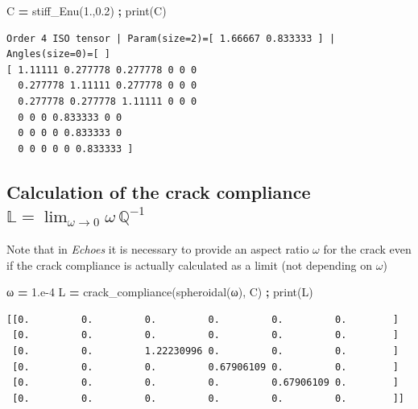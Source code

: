 \documentclass[
  letterpaper,
  DIV=11,
  numbers=noendperiod]{scrreprt}
\newenvironment{Shaded}{\begin{snugshade}}{\end{snugshade}}
\newcommand{\BuiltInTok}[1]{#1}
\newcommand{\FloatTok}[1]{\textcolor[rgb]{0.00,0.00,0.81}{#1}}
\newcommand{\NormalTok}[1]{#1}
\newcommand{\OperatorTok}[1]{\textcolor[rgb]{0.81,0.36,0.00}{\textbf{#1}}}
\begin{document}
\begin{Shaded}
\begin{Highlighting}[]
\NormalTok{C }\OperatorTok{=}\NormalTok{ stiff\_Enu(}\FloatTok{1.}\NormalTok{,}\FloatTok{0.2}\NormalTok{) }\OperatorTok{;} \BuiltInTok{print}\NormalTok{(C)}
\end{Highlighting}
\end{Shaded}

\begin{verbatim}
Order 4 ISO tensor | Param(size=2)=[ 1.66667 0.833333 ] | Angles(size=0)=[ ]
[ 1.11111 0.277778 0.277778 0 0 0 
  0.277778 1.11111 0.277778 0 0 0 
  0.277778 0.277778 1.11111 0 0 0 
  0 0 0 0.833333 0 0 
  0 0 0 0 0.833333 0 
  0 0 0 0 0 0.833333 ]
\end{verbatim}

\hypertarget{calculation-of-the-crack-compliance-mathbbllim_omegato-0omegamathbbq-1}{%
\subsection{\texorpdfstring{Calculation of the crack compliance
\({\mathbb{{L}}}=\lim_{\omega\to 0}\omega\,{\mathbb{{Q}}}^{-1}\)}{Calculation of the crack compliance \{\textbackslash mathbb\{\{L\}\}\}=\textbackslash lim\_\{\textbackslash omega\textbackslash to 0\}\textbackslash omega\textbackslash,\{\textbackslash mathbb\{\{Q\}\}\}\^{}\{-1\}}}\label{calculation-of-the-crack-compliance-mathbbllim_omegato-0omegamathbbq-1}}

Note that in \emph{Echoes} it is necessary to provide an aspect ratio
\(\omega\) for the crack even if the crack compliance is actually
calculated as a limit (not depending on \(\omega\))

\begin{Shaded}
\begin{Highlighting}[]
\NormalTok{ω }\OperatorTok{=} \FloatTok{1.e{-}4}
\NormalTok{L }\OperatorTok{=}\NormalTok{ crack\_compliance(spheroidal(ω), C) }\OperatorTok{;} \BuiltInTok{print}\NormalTok{(L)}
\end{Highlighting}
\end{Shaded}

\begin{verbatim}
[[0.         0.         0.         0.         0.         0.        ]
 [0.         0.         0.         0.         0.         0.        ]
 [0.         0.         1.22230996 0.         0.         0.        ]
 [0.         0.         0.         0.67906109 0.         0.        ]
 [0.         0.         0.         0.         0.67906109 0.        ]
 [0.         0.         0.         0.         0.         0.        ]]
\end{verbatim}
\end{document}
